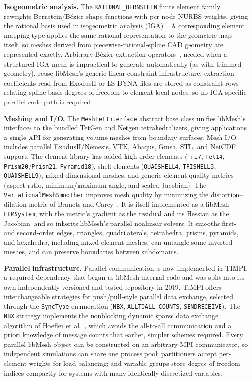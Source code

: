 \documentclass[preprint,12pt, a4paper]{elsarticle}
\begin{document}
\begin{enumerate}
\begin{enumerate}
\textbf{Isogeometric analysis.} The \texttt{RATIONAL\_BERNSTEIN} finite element family reweights
Bernstein/B\'ezier shape functions with per-node NURBS weights, giving the rational basis used in
isogeometric analysis (IGA)~\cite{hughes2005iga}. A corresponding element mapping type applies the
same rational representation to the geometric map itself, so meshes derived from
piecewise-rational-spline CAD geometry are represented exactly. Arbitrary B\'ezier extraction
operators~\cite{borden2011extraction}, needed when a structured IGA mesh is impractical to generate
automatically (as with trimmed geometry), reuse libMesh's generic linear-constraint infrastructure:
extraction coefficients read from ExodusII or LS-DYNA files are stored as constraint rows relating
spline-basis degrees of freedom to element-local nodes, so no IGA-specific parallel code path is
required.

\textbf{Meshing and I/O.} The \texttt{MeshTetInterface} abstract base class unifies libMesh's
interfaces to the bundled TetGen and Netgen tetrahedralizers, giving applications a single API for
generating volume meshes from boundary surfaces. Mesh I/O includes parallel ExodusII/Nemesis, VTK,
Abaqus, Gmsh, STL, and NetCDF support. The element library has added high-order elements
(\texttt{Tri7}, \texttt{Tet14}, \texttt{Prism20}/\texttt{Prism21}, \texttt{Pyramid18}), shell
elements (\texttt{QUADSHELL4}, \texttt{TRISHELL3}, \texttt{QUADSHELL9}), mixed-dimensional meshes,
and generic element-quality metrics (aspect ratio, minimum/maximum angle, and scaled Jacobian).
The \texttt{VariationalMeshSmoother} improves mesh quality by minimizing the distortion--dilation
metric of Branets and Carey~\cite{branets2005smoothing}. It is itself implemented as a libMesh
\texttt{FEMSystem}, with the metric's gradient as the residual and its Hessian as the Jacobian,
and so inherits libMesh's parallel nonlinear solvers. It smooths first- and second-order
edges, triangles, quadrilaterals, tetrahedra, prisms, pyramids, and hexahedra, including
mixed-element meshes, can untangle
some inverted meshes, and can preserve boundaries between subdomains.

\textbf{Parallel infrastructure.} Parallel communication is now implemented in TIMPI, a required
dependency that began as libMesh-internal code and was split into its own independently versioned
and tested repository in 2019. TIMPI offers interchangeable strategies for push/pull-style parallel
data exchange, selected through the \texttt{SyncType} enumeration (\texttt{NBX},
\texttt{ALLTOALL\_COUNTS}, \texttt{SENDRECEIVE}). The \texttt{NBX} strategy implements the
nonblocking dynamic sparse data exchange algorithm of Hoefler et al.~\cite{hoefler2010nbx}, which
avoids the all-to-all communication and a priori knowledge of message counts that earlier, simpler
schemes required. Every parallel libMesh object can be constructed on an arbitrary MPI
communicator, so independent simulations can share one process pool; partitioners accept
per-element weights for load balancing; and variable groups store degree-of-freedom indices
compactly for systems with many identically discretized variables.


\end{enumerate}
\end{enumerate}
\end{document}
